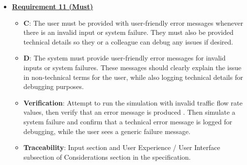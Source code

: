 \documentclass{article}
\begin{document}
\begin{itemize}
    \item \textbf{\underline{Requirement 11 (Must)}}
    \begin{itemize}
        \item \textbf{C}: The user must be provided with user-friendly error messages whenever there is an invalid 
        input or system failure. They must also be provided technical details so they or a colleague can debug any 
        issues if desired.
        \item \textbf{D}: The system must provide user-friendly error messages for invalid inputs or system failures. 
        These messages should clearly explain the issue in non-technical terms for the user, while also logging 
        technical details for debugging purposes.
        \item \textbf{Verification}: Attempt to run the simulation with invalid traffic flow rate values, then verify 
        that an error message is produced . Then simulate a system failure and confirm that a technical error message 
        is logged for debugging, while the user sees a generic failure message.
        \item\textbf{Traceability}: Input section and User Experience / User Interface subsection of Considerations 
        section in the specification.
    \end{itemize}
\end{itemize}
\end{document}
